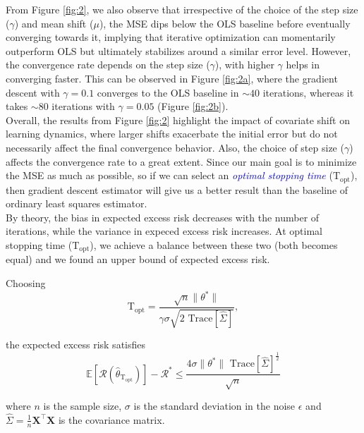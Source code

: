 From Figure \ref{fig:2}, we also observe that irrespective of the choice of the step size ($\gamma$) and mean shift ($\mu$), the MSE dips below the OLS baseline before eventually converging towards it, implying that iterative optimization can momentarily outperform OLS but ultimately stabilizes around a similar error level. However, the convergence rate depends on the step size ($\gamma$), with higher $\gamma$ helps in converging faster. This can be observed in Figure \ref{fig:2a}, where the gradient descent with $\gamma=0.1$ converges to the OLS baseline in $\sim 40$ iterations, whereas it takes $\sim 80$ iterations with $\gamma=0.05$ (Figure \ref{fig:2b}).\\

Overall, the results from Figure \ref{fig:2} highlight the impact of covariate shift on learning dynamics, where larger shifts exacerbate the initial error but do not necessarily affect the final convergence behavior. Also, the choice of step size ($\gamma$) affects the convergence rate to a great extent. Since our main goal is to minimize the MSE as much as possible, so if we can select an \textcolor{blue}{\emph{optimal stopping time}} ($\text{T}_{\text{opt}}$), then gradient descent estimator will give us a better result than the baseline of ordinary least squares estimator.\\

By theory, the bias in expected excess risk decreases with the number of iterations, while the variance in expeced excess risk increases. At optimal stopping time ($\text{T}_{\text{opt}}$), we achieve a balance between these two (both becomes equal) and we found an upper bound of expected excess risk.

\begin{proposition}
Choosing
\begin{equation}
    \text{T}_{\text{opt}} = \frac{\sqrt{n}\lVert \theta^* \rVert}{\gamma \sigma \sqrt{2 \text{ Trace}[\hat{\Sigma}]}},
    \label{eqn:6.9}
\end{equation}

the expected excess risk satisfies
\begin{equation}
    \mathbb{E}[\mathcal{R}(\hat{\theta}_{\text{T}_{\text{opt}}})] - \mathcal{R}^* \leq \frac{4\sigma \lVert \theta^* \rVert \text{ Trace}[\hat{\Sigma}]^{\frac{1}{2}}}{\sqrt{n}}
    \label{eqn:6.10}
\end{equation}

where $n$ is the sample size, $\sigma$ is the standard deviation in the noise $\epsilon$ and $\hat{\Sigma} = \frac{1}{n} \mathbf{X}^\top \mathbf{X}$ is the covariance matrix.
\end{proposition}

